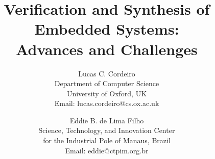 \documentclass{acm_sen_article}
\begin{document}
%
\title{Verification and Synthesis of Embedded Systems: \\ Advances and Challenges}


\author{Lucas C. Cordeiro \\
Department of Computer Science\\
University of Oxford, UK\\
Email: lucas.cordeiro@cs.ox.ac.uk
\and
Eddie B. de Lima Filho \\
Science, Technology, and Innovation Center\\ for the Industrial Pole of Manaus, Brazil \\
Email: eddie@ctpim.org.br}


% 
\end{document}
